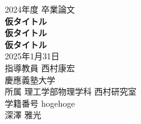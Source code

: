 \documentclass[uplatex,dvipdfmx,titlepage]{jsarticle}
\begin{document}
\begin{titlepage}
\centering
\vspace*{20mm}
{\Large\noindent 2024年度 卒業論文}\\
\vspace{40mm}
{\huge\noindent\textbf{仮タイトル}}\\
\medskip
{\huge\noindent\textbf{仮タイトル}}\\
\medskip
{\huge\noindent\textbf{仮タイトル}}\\
\vspace{\baselineskip}
\vspace{40mm}
{\Large\noindent
2025年1月31日\\
\vspace{\baselineskip}
指導教員 西村康宏\\
\vspace{\baselineskip}
慶應義塾大学\\
所属 理工学部物理学科 西村研究室\\
\vspace{\baselineskip}
学籍番号 hogehoge\\
深澤 雅光 \\
}
\end{titlepage}
\begin{abstract}
\end{abstract}
\tableofcontents
\clearpage
\listoffigures
\clearpage
\listoftables
\clearpage



\end{document}
